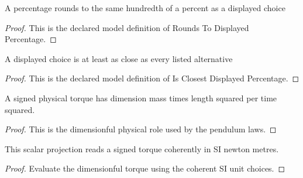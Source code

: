 \begin{definition}
  \label{def:physics:phyx-mini-0227:phyxminiproblems-problemphyxmini0227-roundstodisplayedpercentage}
  A percentage rounds to the same hundredth of a percent as a displayed choice
\end{definition}
\begin{proof}
  This is the declared model definition of Rounds To Displayed Percentage.
\end{proof}
\begin{definition}
  \label{def:physics:phyx-mini-0227:phyxminiproblems-problemphyxmini0227-isclosestdisplayedpercentage}
  A displayed choice is at least as close as every listed alternative
\end{definition}
\begin{proof}
  This is the declared model definition of Is Closest Displayed Percentage.
\end{proof}
\begin{definition}
  \label{def:physics:phyx-mini-0227:phyxminiproblems-problemphyxmini0227-torquequantity}
  A signed physical torque has dimension mass times length squared per time squared.
\end{definition}
\begin{proof}
  This is the dimensionful physical role used by the pendulum laws.
\end{proof}
\begin{definition}
  \label{def:physics:phyx-mini-0227:phyxminiproblems-problemphyxmini0227-torqueinnewtonmeters}
  This scalar projection reads a signed torque coherently in SI newton metres.
\end{definition}
\begin{proof}
  Evaluate the dimensionful torque using the coherent SI unit choices.
\end{proof}
